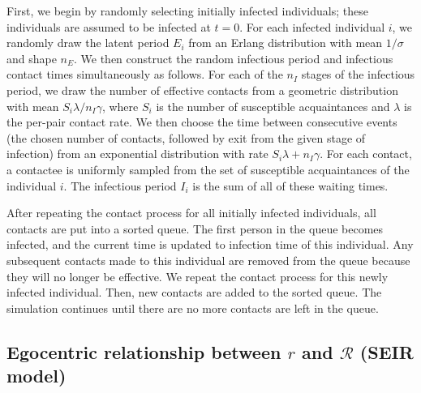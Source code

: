 \documentclass[12pt]{article}
\newcommand{\RR}{\ensuremath{{\mathcal R}}}
\begin{document}
First, we begin by randomly selecting initially infected individuals; these individuals are assumed to be infected at $t = 0$.
For each infected individual $i$, we randomly draw the latent period $E_i$ from an Erlang distribution with mean $1/\sigma$ and shape $n_E$.
We then construct the random infectious period and infectious contact times simultaneously as follows.
For each of the $n_I$ stages of the infectious period, we draw the number of effective contacts from a geometric distribution with mean $S_i \lambda / n_I\gamma$, where $S_i$ is the number
of susceptible acquaintances and $\lambda$ is the per-pair contact rate.
We then choose the time between consecutive events (the chosen number of contacts, followed by exit from the given stage of infection) from an exponential distribution with rate $S_i \lambda + n_I\gamma$.
For each contact, a contactee is uniformly sampled from the set of susceptible acquaintances of the individual $i$.
The infectious period $I_i$ is the sum of all of these waiting times.

After repeating the contact process for all initially infected individuals, all contacts are put into a sorted queue.
The first person in the queue becomes infected, and the current time is updated to infection time of this individual. 
Any subsequent contacts made to this individual are removed from the queue because they will no longer be effective.
We repeat the contact process for this newly infected individual.
Then, new contacts are added to the sorted queue.
The simulation continues until there are no more contacts are left in the queue.

\subsection{Egocentric relationship between $r$ and $\RR$ (SEIR model)}
\end{document}
